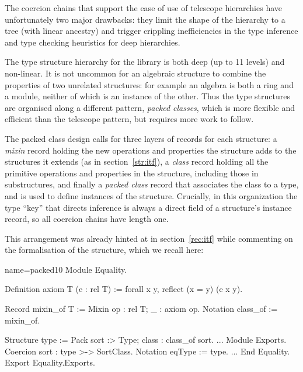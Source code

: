The coercion chains that support the ease of use of telescope
hierarchies have unfortunately two major drawbacks: they limit the
shape of the hierarchy to a tree (with linear ancestry) and
trigger crippling inefficiencies in the type inference and type
checking heuristics for deep hierarchies.

\label{sec:packed}

The type structure hierarchy for the \mcbMC{} library is both deep
(up to 11 levels) and non-linear. It is not uncommon for an algebraic
structure to combine the properties of two unrelated structures: for
example an algebra is both a ring and a module, neither of which is an
instance of the other. Thus the \mcbMC{} type structures are organised
along a different pattern, \emph{packed classes}, which is more flexible
and efficient than the telescope pattern, but requires more work to follow.

The packed class design calls for three layers of records for each
structure: a \emph{mixin} record holding the new operations and
properties the structure adds to the structures it extends (as in
section~\ref{str:itf}), a \emph{class} record holding all the
primitive operations and properties in the structure,
including those in substructures,
and finally a \emph{packed class} record that associates the class to
a type, and is used to define instances of the structure. Crucially,
in this organization the type ``key'' that directs inference is always
a direct field of a structure's instance record, so all coercion
chains have length one.

This arrangement was already hinted at in section~\ref{rec:itf} while
commenting on the formalisation of the  structure,
which we recall here:

\begin{coq}{name=packed10}{}
Module Equality.

Definition axiom T (e : rel T) := forall x y, reflect (x = y) (e x y).

Record mixin_of T := Mixin {op : rel T; _ : axiom op}.
Notation class_of := mixin_of.

Structure type := Pack {sort :> Type; class : class_of sort}.
...
Module Exports.
Coercion sort : type >-> SortClass.
Notation eqType := type.
...
End Equality.
Export Equality.Exports.
\end{coq}

